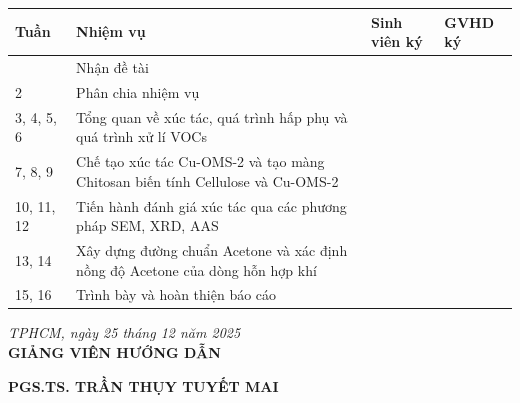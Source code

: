 \documentclass{article} %
\begin{document}
\begin{table}[H]
    \centering
    \begin{tabular}{@{}|
                >{\centering\arraybackslash}m{1.9cm}|    
                >{\centering\arraybackslash}m{9cm}|
                >{\centering\arraybackslash}m{2cm}|
                >{\centering\arraybackslash}m{2cm}|@{}} \hline
        \textbf{Tuần} & \textbf{Nhiệm vụ} & \textbf{Sinh viên ký} & \textbf{GVHD ký}\\ \hline
        1 & Nhận đề tài & \multirow{16}{*}{} & \multirow{16}{*}{} \\ \cline{1-2}
        2 & Phân chia nhiệm vụ & \multirow{16}{*}{} & \multirow{16}{*}{} \\ \cline{1-2}
        3, 4, 5, 6 & Tổng quan về xúc tác, quá trình hấp phụ và quá trình xử lí VOCs & \multirow{16}{*}{} & \multirow{16}{*}{} \\ \cline{1-2}
        7, 8, 9 & Chế tạo xúc tác Cu-OMS-2 và tạo màng Chitosan biến tính Cellulose và Cu-OMS-2 & \multirow{16}{*}{} & \multirow{16}{*}{} \\ \cline{1-2}
        10, 11, 12 & Tiến hành đánh giá xúc tác qua các phương pháp SEM, XRD, AAS & \multirow{16}{*}{} & \multirow{16}{*}{} \\ \cline{1-2}
        13, 14 & Xây dựng đường chuẩn Acetone và xác định nồng độ Acetone của dòng hỗn hợp khí & \multirow{16}{*}{} & \multirow{16}{*}{} \\ \cline{1-2}
        15, 16 & Trình bày và hoàn thiện báo cáo & \multirow{16}{*}{} & \multirow{16}{*}{} \\ \hline
    \end{tabular}
\end{table}

\noindent
\begin{minipage}[t]{0.4\textwidth}
\end{minipage}
\hfill
\begin{minipage}[t]{0.6\textwidth}
\centering
\textit{TPHCM, ngày 25 tháng 12 năm 2025}\\
\textbf{GIẢNG VIÊN HƯỚNG DẪN}
\end{minipage}

\vspace{1cm}

\noindent
\begin{minipage}[t]{0.4\textwidth}
\hfill
\end{minipage}
\begin{minipage}[t]{0.6\textwidth}
\centering
\textbf{PGS.TS. TRẦN THỤY TUYẾT MAI}
\end{minipage}
\end{document}
